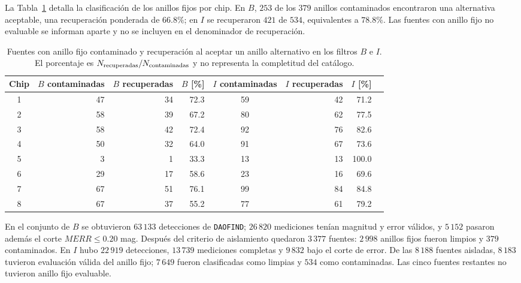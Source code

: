 \documentclass[12pt,letterpaper,oneside]{book}
\begin{document}
La Tabla~\ref{tab:sextans-bi-recuperadas-chip} detalla la clasificación de los anillos fijos por chip. En $B$, $253$ de los $379$ anillos contaminados encontraron una alternativa aceptable, una recuperación ponderada de $66.8\%$; en $I$ se recuperaron $421$ de $534$, equivalentes a $78.8\%$. Las fuentes con anillo fijo no evaluable se informan aparte y no se incluyen en el denominador de recuperación.

\begin{table}[H]
\centering
\small
\begin{tabular}{crrrcrrr}
\toprule
Chip & $B$ contaminadas & $B$ recuperadas & $B$ [\%] & $I$ contaminadas & $I$ recuperadas & $I$ [\%] \\
\midrule
1 & 47 & 34 & 72.3 & 59 & 42 & 71.2 \\
2 & 58 & 39 & 67.2 & 80 & 62 & 77.5 \\
3 & 58 & 42 & 72.4 & 92 & 76 & 82.6 \\
4 & 50 & 32 & 64.0 & 91 & 67 & 73.6 \\
5 & 3 & 1 & 33.3 & 13 & 13 & 100.0 \\
6 & 29 & 17 & 58.6 & 23 & 16 & 69.6 \\
7 & 67 & 51 & 76.1 & 99 & 84 & 84.8 \\
8 & 67 & 37 & 55.2 & 77 & 61 & 79.2 \\
\bottomrule
\end{tabular}
\caption{Fuentes con anillo fijo contaminado y recuperación al aceptar un anillo alternativo en los filtros $B$ e $I$. El porcentaje es $N_{\rm recuperadas}/N_{\rm contaminadas}$ y no representa la completitud del catálogo.}
\label{tab:sextans-bi-recuperadas-chip}
\end{table}

En el conjunto de $B$ se obtuvieron $63\,133$ detecciones de \texttt{DAOFIND}; $26\,820$ mediciones tenían magnitud y error válidos, y $5\,152$ pasaron además el corte $MERR\leq0.20$ mag. Después del criterio de aislamiento quedaron $3\,377$ fuentes: $2\,998$ anillos fijos fueron limpios y $379$ contaminados. En $I$ hubo $22\,919$ detecciones, $13\,739$ mediciones completas y $9\,832$ bajo el corte de error. De las $8\,188$ fuentes aisladas, $8\,183$ tuvieron evaluación válida del anillo fijo; $7\,649$ fueron clasificadas como limpias y $534$ como contaminadas. Las cinco fuentes restantes no tuvieron anillo fijo evaluable.
\end{document}

